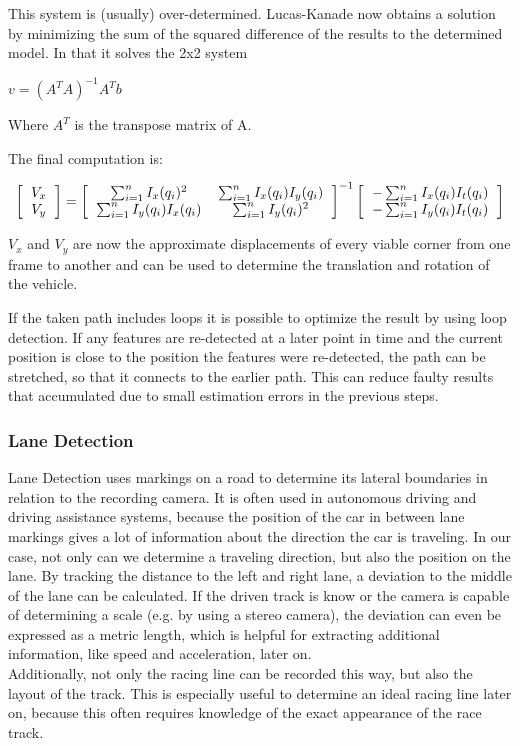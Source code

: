 This system is (usually) over-determined. Lucas-Kanade now obtains a solution by minimizing the sum of the squared difference of the results to the determined model.
In that it solves the 2x2 system

	$v = (A^T A)^{-1} A^T b$

Where $A^T$ is the transpose matrix of A.

The final computation is:

\[
\left[
\begin{tabular}{c}
	$V_x$ \\
	$V_y$
\end{tabular}
\right]
= 
\left[
\begin{tabular}{cc}
	$\sum_{i = 1}^n I_x(q_i)^2$ & $\sum_{i = 1}^n I_x(q_i) I_y(q_i)$ \\
	$\sum_{i = 1}^n I_y(q_i) I_x(q_i)$ & $\sum_{i = 1}^n I_y(q_i)^2$
\end{tabular}
\right]
^{-1}
\left[
\begin{tabular}{c}
	$- \sum_{i = 1}^n I_x(q_i) I_t(q_i)$ \\
	$- \sum_{i = 1}^n I_y(q_i) I_t(q_i)$ 
\end{tabular}
\right]
\]

$V_x$ and $V_y$ are now the approximate displacements of every viable corner from one frame to another and can be used to determine the translation and rotation of the vehicle.

If the taken path includes loops it is possible to optimize the result by using loop detection. If any features are re-detected at a later point in time and the current position is close to the position the features were re-detected, the path can be stretched, so that it connects to the earlier path.
This can reduce faulty results that accumulated due to small estimation errors in the previous steps.

\subsubsection{Lane Detection}
Lane Detection uses markings on a road to determine its lateral boundaries in relation to the recording camera. It is often used in autonomous driving and driving assistance systems, because the position of the car in between lane markings gives a lot of information about the direction the car is traveling. 
In our case, not only can we determine a traveling direction, but also the position on the lane.
By tracking the distance to the left and right lane, a deviation to the middle of the lane can be calculated. 
If the driven track is know or the camera is capable of determining a scale (e.g. by using a stereo camera), the deviation can even be expressed as a metric length, which is helpful for extracting additional information, like speed and acceleration, later on.\\
Additionally, not only the racing line can be recorded this way, but also the layout of the track. This is especially useful to determine an ideal racing line later on, because this often requires knowledge of the exact appearance of the race track.

